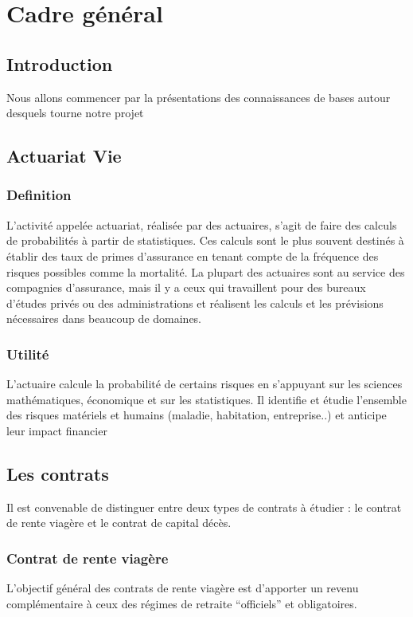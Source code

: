 \documentclass{article}
\begin{document}
\section{Cadre général}
\subsection{Introduction}
{\large Nous allons commencer par la présentations des connaissances de bases autour desquels tourne notre projet}
\subsection{Actuariat Vie}
\subsubsection{Definition}
{\large L'activité appelée actuariat, réalisée par des actuaires, s'agit de faire des calculs de probabilités à partir de statistiques. Ces calculs sont le plus souvent destinés à établir des taux de primes d'assurance en tenant compte de la fréquence des risques possibles comme la mortalité. La plupart des actuaires sont au service des compagnies d'assurance, mais il y a ceux qui travaillent pour des bureaux d'études privés ou des administrations et réalisent les calculs et les prévisions nécessaires dans beaucoup de domaines.
\subsubsection{Utilité}
{\large L'actuaire calcule la probabilité de certains risques en s'appuyant sur les sciences mathématiques, économique et sur les statistiques. Il identifie et étudie l'ensemble des risques matériels et humains (maladie, habitation, entreprise..) et anticipe leur impact financier}
\subsection{Les contrats}
{\large Il est convenable de distinguer entre deux types de contrats à étudier : le contrat de rente viagère et le contrat de capital décès.}
\subsubsection{Contrat de rente viagère}
{\large L’objectif général des contrats de rente viagère est d’apporter un revenu complémentaire à ceux des régimes de retraite “officiels” et obligatoires.}

}
\end{document}
